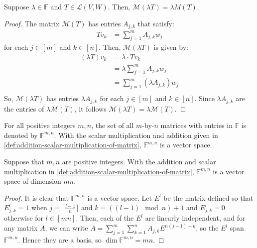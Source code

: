 \documentclass{article}
\begin{document}
\begin{theorem}
  \label{thm:matrix-of-scalar-multiple-times-linear-map}
  Suppose $\lambda \in \mathbb{F}$ and $T \in \mathcal{L}(V,
  W)$. Then, $\mathcal{M}(\lambda T) = \lambda M(T)$.
\end{theorem}
\begin{proof}
  The matrix $\mathcal{M}(T)$ has entries $A_{j, k}$ that satisfy:
  \begin{align*}
    Tv_k &= \sum_{j=1}^m A_{j,k}w_j
  \end{align*}
  for each $j \in [m]$ and $k \in [n]$. Then, $\mathcal{M}(\lambda T)$
  is given by:
  \begin{align*}
    (\lambda T)v_k &= \lambda \cdot Tv_k \\
                   &= \lambda \sum_{j=1}^m A_{j, k}w_j \\
                   &= \sum_{j=1}^m (\lambda A_{j, k}) w_j \\
  \end{align*}
  So, $\mathcal{M}(\lambda T)$ has entries $\lambda A_{j, k}$ for each
  $j \in [m]$ and $k \in [n]$. Since $\lambda A_{j, k}$ are the entries of
  $\lambda \mathcal{M}(T)$, it follows $\mathcal{M}(\lambda T) =
  \lambda \mathcal{M}(T)$.
\end{proof}

\begin{remark}
  For all positive integers $m, n$, the set of all $m$-by-$n$ matrices
  with entries in $\mathbb{F}$ is denoted by $\mathbb{F}^{m,n}$. With
  the scalar multiplication and addition given in
  \cref{def:addition-scalar-multiplication-of-matrix}, $\mathbb{F}^{m,
  n}$ is a vector space.
\end{remark}

\begin{theorem}
  \label{thm:dimension-of-Fmn-is-mn}
  Suppose that $m, n$ are positive integers. With the addition and
  scalar multiplication in
  \cref{def:addition-scalar-multiplication-of-matrix}, $\mathbb{F}^{m,
  n}$ is a vector space of dimension $mn$.
\end{theorem}
\begin{proof}
  It is clear that $\mathbb{F}^{m, n}$ is a vector space. Let $E^l$ be
  the matrix defined so that $E^l_{j, k} = 1$ when $j = \lceil
  \frac{l - 1}{n} \rceil $ and $k = ((l - 1) \mod n) + 1$ and $E^l_{j, k} = 0$
  otherwise for $l \in [mn]$. Then, each of the $E^l$ are linearly
  independent, and for any matrix $A$, we can write $A = \sum_{j=1}^m
  \sum_{k=1}^n A_{j, k} E^{n(j-1) + k}$, so the $E^l$ span
  $\mathbb{F}^{m, n}$. Hence they are a basis, so $\dim \mathbb{F}^{m, n} = mn$.
\end{proof}
\end{document}
